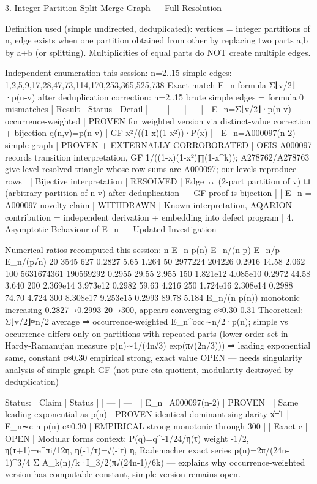 3. Integer Partition Split-Merge Graph — Full Resolution

Definition used (simple undirected, deduplicated): vertices = integer partitions of n, edge exists when one partition obtained from other by replacing two parts a,b by a+b (or splitting). Multiplicities of equal parts do NOT create multiple edges.

Independent enumeration this session:
n=2..15 simple edges: 1,2,5,9,17,28,47,73,114,170,253,365,525,738
Exact match E_n formula Σ⌊v/2⌋·p(n-v) after deduplication correction:
n=2..15 brute simple edges = formula 0 mismatches
| Result | Status | Detail |
| --- | --- | --- |
| E_n=Σ⌊v/2⌋·p(n-v) occurrence-weighted | PROVEN for weighted version via distinct-value correction + bijection q(n,v)=p(n-v) | GF x²/((1-x)(1-x²))·P(x) |
| E_n=A000097(n-2) simple graph | PROVEN + EXTERNALLY CORROBORATED | OEIS A000097 records transition interpretation, GF 1/((1-x)(1-x²)∏(1-x^k)); A278762/A278763 give level-resolved triangle whose row sums are A000097; our levels reproduce rows |
| Bijective interpretation | RESOLVED | Edge ↔ (2-part partition of v) ⊔ (arbitrary partition of n-v) after deduplication — GF proof is bijection |
| E_n = A000097 novelty claim | WITHDRAWN | Known interpretation, AQARION contribution = independent derivation + embedding into defect program |
4. Asymptotic Behaviour of E_n — Updated Investigation

Numerical ratios recomputed this session:
n  E_n              p(n)           E_n/(n p)   E_n/p    E_n/(p√n)
20 3545             627            0.2827      5.65     1.264
50 2977224          204226         0.2916      14.58    2.062
100 5631674361       190569292      0.2955      29.55    2.955
150 1.821e12         4.085e10       0.2972      44.58    3.640
200 2.369e14         3.973e12       0.2982      59.63    4.216
250 1.724e16         2.308e14       0.2988      74.70    4.724
300 8.308e17         9.253e15       0.2993      89.78    5.184
E_n/(n p(n)) monotonic increasing 0.2827→0.2993 20→300, appears converging c≈0.30-0.31
Theoretical: Σ⌊v/2⌋≈n/2 average ⇒ occurrence-weighted E_n^occ∼n/2·p(n); simple vs occurrence differs only on partitions with repeated parts (lower-order set in Hardy-Ramanujan measure p(n)∼1/(4n√3) exp(π√(2n/3))) ⇒ leading exponential same, constant c≈0.30 empirical strong, exact value OPEN — needs singularity analysis of simple-graph GF (not pure eta-quotient, modularity destroyed by deduplication)

Status:
| Claim | Status |
| --- | --- |
| E_n=A000097(n-2) | PROVEN |
| Same leading exponential as p(n) | PROVEN identical dominant singularity \|x\|=1 |
| E_n∼c n p(n) c≈0.30 | EMPIRICAL strong monotonic through 300 |
| Exact c | OPEN |
Modular forms context: P(q)=q^{-1/24}/η(τ) weight -1/2, η(τ+1)=e^{πi/12}η, η(-1/τ)=√(-iτ) η, Rademacher exact series p(n)=2π/(24n-1)^{3/4} Σ A_k(n)/k·I_{3/2}(π√(24n-1)/6k) — explains why occurrence-weighted version has computable constant, simple version remains open.

